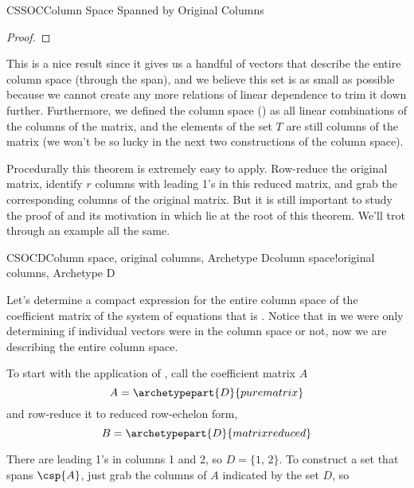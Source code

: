 \begin{subsect}{CSSOC}{Column Space Spanned by Original Columns}
\begin{proof}
%
\end{proof}
%
\begin{para}This is a nice result since it gives us a handful of vectors that describe the entire column space (through the span), and we believe this set is as small as possible because we cannot create any more relations of linear dependence to trim it down further.  Furthermore, we defined the column space () as all linear combinations of the columns of the matrix, and the elements of the set $T$ are still columns of the matrix (we won't be so lucky in the next two constructions of the column space).\end{para}
%
\begin{para}Procedurally this theorem is extremely easy to apply.  Row-reduce the original matrix, identify $r$ columns with leading 1's in this reduced matrix, and grab the corresponding columns of the original matrix.  But it is still important to study the proof of  and its motivation in  which lie at the root of this theorem.  We'll trot through an example all the same.\end{para}
%
\begin{example}{CSOCD}{Column space, original columns, Archetype D}{column space!original columns,  Archetype D}
\begin{para}Let's determine a compact expression for the entire column space of the coefficient matrix of the system of equations that is .  Notice that in  we were only determining if individual vectors were in the column space or not, now we are describing the entire column space.\end{para}
%
\begin{para}To start with the application of , call the coefficient matrix $A$
%
\begin{equation*}
A=\archetypepart{D}{purematrix}\end{equation*}
%
and row-reduce it to reduced row-echelon form,
%
\begin{equation*}
B=\archetypepart{D}{matrixreduced}\end{equation*}
\end{para}
%
\begin{para}There are leading 1's in columns 1 and 2, so $D=\{1,\,2\}$.  To construct a set that spans $\csp{A}$, just grab the columns of $A$ indicated by the set $D$, so
%
\begin{equation*}

\end{equation*}
\end{para}
\end{example}
\end{subsect}
